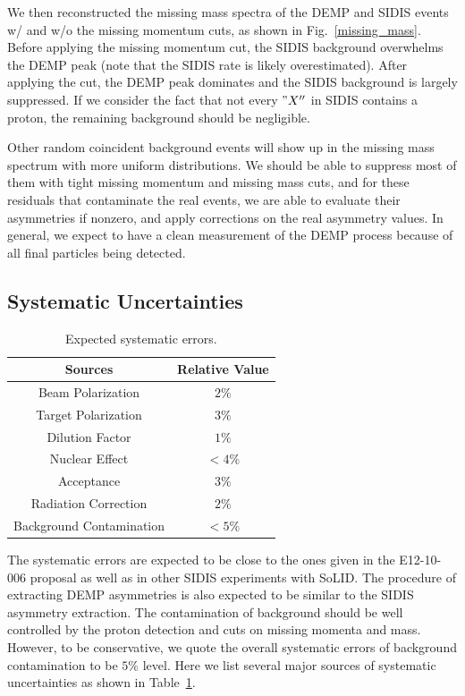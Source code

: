 We then reconstructed the missing mass spectra of the DEMP and SIDIS events w/
and w/o the missing momentum cuts, as shown in Fig.~\ref{missing_mass}. Before
applying the missing momentum cut, the SIDIS background overwhelms the DEMP
peak (note that the SIDIS rate is likely overestimated). After applying the
cut, the DEMP peak dominates and the SIDIS background is largely suppressed. If
we consider the fact that not every $"X''$ in SIDIS contains a proton, the
remaining background should be negligible.

Other random coincident background events will show up in the missing mass
spectrum with more uniform distributions. We should be able to suppress most of
them with tight missing momentum and missing mass cuts, and for these residuals
that contaminate the real events, we are able to evaluate their asymmetries if
nonzero, and apply corrections on the real asymmetry values. In general, we
expect to have a clean measurement of the DEMP process because of all final
particles being detected.

\subsection{Systematic Uncertainties}

\begin{table}[!htp]
\centering
\begin{tabular}{|c|c|}
\hline
{\bf Sources}            & {\bf Relative Value} \\\hline
Beam Polarization        & $2\%$ \\\hline 
Target Polarization      & $3\%$ \\\hline 
Dilution Factor          &  $1\%$ \\\hline 
Nuclear Effect           &  $<4\%$ \\\hline 
Acceptance               & $3\%$ \\\hline
Radiation Correction     & $2\%$ \\\hline
Background Contamination & $<5\%$ \\\hline
\end{tabular}
\caption{\footnotesize{Expected systematic errors.}}\label{table:det_sys_err}
\end{table}

The systematic errors are expected to be close to the ones given in the
E12-10-006 proposal as well as in other SIDIS experiments with SoLID. The
procedure of extracting DEMP asymmetries is also expected to be similar to the
SIDIS asymmetry extraction.  The contamination of background should be well
controlled by the proton detection and cuts on missing momenta and mass.
However, to be conservative, we quote the overall systematic errors of
background contamination to be $5\%$ level.  Here we list several major sources
of systematic uncertainties as shown in Table~\ref{table:det_sys_err}.

